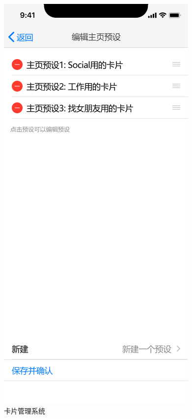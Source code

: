 \documentclass[UTF8]{ctexart}
\begin{document}
\begin{figure}[htbp]
{\begin{minipage}[b]{.3\linewidth}
            \includegraphics[scale=0.3]{EditHomepagePreset.png}
        \end{minipage}
    }
    \caption{卡片管理系统}
    \label{CardManageSystem}
\end{figure}
\end{document}
